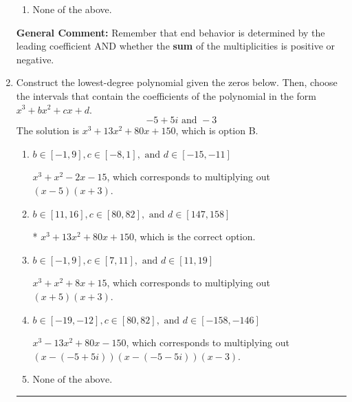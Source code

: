 \documentclass{extbook}[14pt]
\newcommand{\litem}[1]{\item #1

\rule{\textwidth}{0.4pt}}
\begin{document}
\begin{enumerate}
{\begin{enumerate}[label=\Alph*.]
\item None of the above.\end{enumerate}
\textbf{General Comment:} Remember that end behavior is determined by the leading coefficient AND whether the \textbf{sum} of the multiplicities is positive or negative.
}
\litem{
Construct the lowest-degree polynomial given the zeros below. Then, choose the intervals that contain the coefficients of the polynomial in the form $x^3+bx^2+cx+d$.
\[ -5 + 5 i \text{ and } -3 \]The solution is \( x^{3} +13 x^{2} +80 x + 150 \), which is option B.\begin{enumerate}[label=\Alph*.]
\item \( b \in [-1, 9], c \in [-8, 1], \text{ and } d \in [-15, -11] \)

$x^{3} + x^{2} -2 x -15$, which corresponds to multiplying out $(x -5)(x + 3)$.
\item \( b \in [11, 16], c \in [80, 82], \text{ and } d \in [147, 158] \)

* $x^{3} +13 x^{2} +80 x + 150$, which is the correct option.
\item \( b \in [-1, 9], c \in [7, 11], \text{ and } d \in [11, 19] \)

$x^{3} + x^{2} +8 x + 15$, which corresponds to multiplying out $(x + 5)(x + 3)$.
\item \( b \in [-19, -12], c \in [80, 82], \text{ and } d \in [-158, -146] \)

$x^{3} -13 x^{2} +80 x -150$, which corresponds to multiplying out $(x-(-5 + 5 i))(x-(-5 - 5 i))(x -3)$.
\item \( \text{None of the above.} \)


\end{enumerate}}
\end{enumerate}
\end{document}
